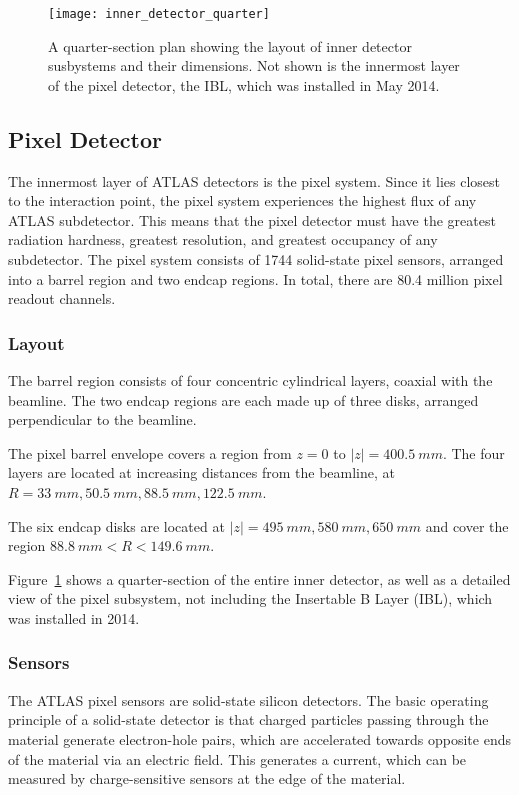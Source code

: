 \begin{figure}[!ht]\centering
\texttt{[image: inner\_detector\_quarter]}
\caption{A quarter-section plan showing the layout of inner detector susbystems and their dimensions.
Not shown is the innermost layer of the pixel detector, the IBL, which was installed in May 2014.}
\label{fig:inner_detector_quarter}
\end{figure}

\subsection{Pixel Detector}\label{subsec:pixel}

The innermost layer of ATLAS detectors is the pixel system.
Since it lies closest to the interaction point, the pixel system experiences the highest flux of any ATLAS subdetector.
This means that the pixel detector must have the greatest radiation hardness, greatest resolution,
and greatest occupancy of any subdetector.\cite{atlas-detector-2008}
The pixel system consists of 1744 solid-state pixel sensors, arranged into a barrel region and two endcap regions.
In total, there are 80.4 million pixel readout channels.\cite{atlas-detector-2008}

\subsubsection{Layout}
The barrel region consists of four concentric cylindrical layers, coaxial with the beamline.
The two endcap regions are each made up of three disks, arranged perpendicular to the beamline.

The pixel barrel envelope covers a region from $z = 0$ to $|z|  = 400.5~mm$.
The four layers are located at increasing distances from the beamline, at $R = 33~mm, 50.5~mm, 88.5~mm, 122.5~mm$.

The six endcap disks are located at $|z| = 495~mm, 580~mm, 650~mm$ and cover the region $88.8~mm < R < 149.6~mm$.\cite{atlas-detector-2008}

Figure~\ref{fig:inner_detector_quarter} shows a quarter-section of
the entire inner detector, as well as a detailed view of the pixel
subsystem, not including the Insertable B Layer (IBL), which was
installed in 2014.

\subsubsection{Sensors}
The ATLAS pixel sensors are solid-state silicon detectors.
The basic operating principle of a solid-state detector is that charged particles passing through the material
generate electron-hole pairs, which are accelerated towards opposite ends of the material via an electric field.
This generates a current, which can be measured by charge-sensitive sensors at the edge of the material.\cite{spieler-2005}


